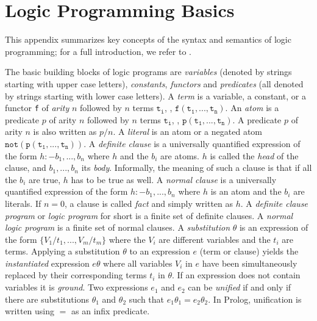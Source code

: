 \section{Logic Programming Basics}
\label{app:lp}
This appendix summarizes key concepts of the syntax and semantics of logic programming; for a full introduction, we refer to \citep{lloyd2012foundations}.

The basic building blocks of logic programs are \emph{variables} (denoted by strings starting with upper case letters), \emph{constants}, \emph{functors} and
\emph{predicates} (all denoted by strings starting with lower case letters).  A \emph{term} is a variable, a constant, or a functor
\texttt{f} of \emph{arity} $n$ followed by $n$ terms $\mathtt{t_i}$, \ie,
$\mathtt{f(t_1,...,t_n)}$. 
An \emph{atom} is a predicate $p$ of arity $n$ followed by $n$ terms $\mathtt{t_i}$, \ie,
$\mathtt{p(t_1,...,t_n)}$. A predicate $p$ of arity $n$ is also written as $p/n$. A \emph{literal} is an
atom or a negated atom $\mathtt{not(p(t_1,...,t_n))}$. A \emph{definite
  clause} is a universally quantified expression of the form $h
:- b_1, ... , b_n$ where $h$ and the $b_i$ are atoms.
$h$ is called the \emph{head} of the clause, and $b_1, ... , b_n$ its
\emph{body}. Informally, the meaning of such a clause is that if all
the $b_i$ are true, $h$ has to be true as well. 
 A
\emph{normal clause}  is a universally quantified expression of the form $h
:- b_1, ... , b_n$ where $h$ is an atom and the $b_i$ are
literals.
If $n=0$, a clause is called \emph{fact} and simply written
as $h$. A \emph{definite clause program} or \emph{logic program} for
short is a finite set of definite clauses. A \emph{normal logic
  program} is a finite set of normal clauses. 
A \emph{substitution} $\theta$ is an expression of the form
$\{V_1/t_1,...,V_m/t_m\}$ where the $V_i$ are different variables and
the $t_i$ are terms. Applying a substitution $\theta$ to an expression
$e$ (term or clause) yields the \emph{instantiated} expression $e\theta$
where all variables $V_i$ in $e$ have been simultaneously replaced by
their corresponding terms $t_i$ in $\theta$. If an expression does not
contain variables it is \emph{ground}. Two expressions $e_1$ and $e_2$ can be \emph{unified} if and only if there are substitutions $\theta_1$ and $\theta_2$ such that $e_1\theta_1 = e_2\theta_2$. In Prolog, unification is written using $=$ as an infix predicate. 

